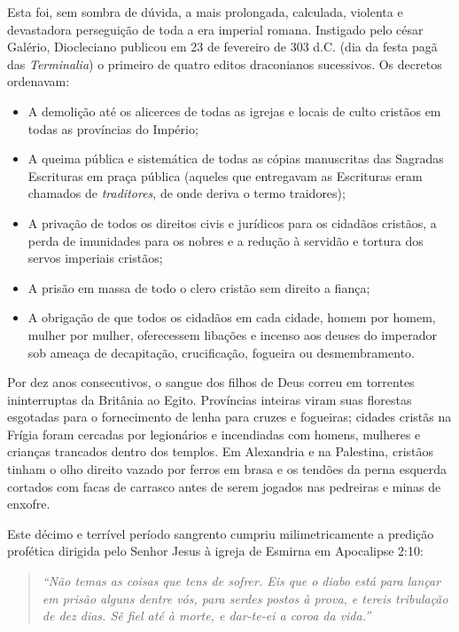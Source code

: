 \documentclass[11pt,a4paper,openany]{book}
\begin{document}
Esta foi, sem sombra de dúvida, a mais prolongada, calculada, violenta e devastadora perseguição de toda a era imperial romana. Instigado pelo césar Galério, Diocleciano publicou em 23 de fevereiro de 303 d.C. (dia da festa pagã das \textit{Terminalia}) o primeiro de quatro editos draconianos sucessivos.
Os decretos ordenavam:
\begin{itemize}
  \item A demolição até os alicerces de todas as igrejas e locais de culto cristãos em todas as províncias do Império;
  \item A queima pública e sistemática de todas as cópias manuscritas das Sagradas Escrituras em praça pública (aqueles que entregavam as Escrituras eram chamados de \textit{traditores}, de onde deriva o termo traidores);
  \item A privação de todos os direitos civis e jurídicos para os cidadãos cristãos, a perda de imunidades para os nobres e a redução à servidão e tortura dos servos imperiais cristãos;
  \item A prisão em massa de todo o clero cristão sem direito a fiança;
  \item A obrigação de que todos os cidadãos em cada cidade, homem por homem, mulher por mulher, oferecessem libações e incenso aos deuses do imperador sob ameaça de decapitação, crucificação, fogueira ou desmembramento.
\end{itemize}


Por dez anos consecutivos, o sangue dos filhos de Deus correu em torrentes ininterruptas da Britânia ao Egito. Províncias inteiras viram suas florestas esgotadas para o fornecimento de lenha para cruzes e fogueiras; cidades cristãs na Frígia foram cercadas por legionários e incendiadas com homens, mulheres e crianças trancados dentro dos templos. Em Alexandria e na Palestina, cristãos tinham o olho direito vazado por ferros em brasa e os tendões da perna esquerda cortados com facas de carrasco antes de serem jogados nas pedreiras e minas de enxofre.

Este décimo e terrível período sangrento cumpriu milimetricamente a predição profética dirigida pelo Senhor Jesus à igreja de Esmirna em Apocalipse 2:10:

\begin{quote}
\itshape ``Não temas as coisas que tens de sofrer. Eis que o diabo está para lançar em prisão alguns dentre vós, para serdes postos à prova, e tereis tribulação de dez dias. Sê fiel até à morte, e dar-te-ei a coroa da vida.''
\end{quote}
\end{document}

